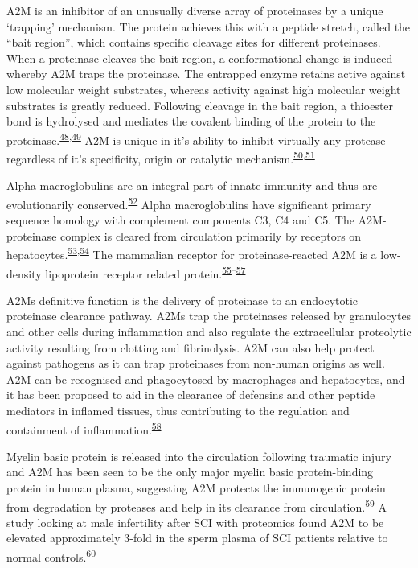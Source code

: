 \documentclass[
]{article}
\begin{document}
A2M is an inhibitor of an unusually diverse array of proteinases by a unique `trapping' mechanism.
The protein achieves this with a peptide stretch, called the ``bait region'', which contains specific cleavage sites for different proteinases.
When a proteinase cleaves the bait region, a conformational change is induced whereby A2M traps the proteinase.
The entrapped enzyme retains active against low molecular weight substrates, whereas activity against high molecular weight substrates is greatly reduced.
Following cleavage in the bait region, a thioester bond is hydrolysed and mediates the covalent binding of the protein to the proteinase.\textsuperscript{\protect\hyperlink{ref-hall_proteolytic_1981}{48},\protect\hyperlink{ref-sottrup-jensen_primary_1984}{49}}
A2M is unique in it's ability to inhibit virtually any protease regardless of it's specificity, origin or catalytic mechanism.\textsuperscript{\protect\hyperlink{ref-khan_oxidized_2004}{50},\protect\hyperlink{ref-lin_n-glycosylation_2012}{51}}

Alpha macroglobulins are an integral part of innate immunity and thus are evolutionarily conserved.\textsuperscript{\protect\hyperlink{ref-buresova_iram2-macroglobulin_2009}{52}}
Alpha macroglobulins have significant primary sequence homology with complement components C3, C4 and C5.
The A2M-proteinase complex is cleared from circulation primarily by receptors on hepatocytes.\textsuperscript{\protect\hyperlink{ref-bond_incorporation_2007}{53},\protect\hyperlink{ref-travis_human_1983}{54}}
The mammalian receptor for proteinase‐reacted A2M is a low‐density lipoprotein receptor related protein.\textsuperscript{\protect\hyperlink{ref-fujiyoshi_amyloid-_2011}{55}--\protect\hyperlink{ref-wyatt_acute_2013}{57}}

A2Ms definitive function is the delivery of proteinase to an endocytotic proteinase clearance pathway.
A2Ms trap the proteinases released by granulocytes and other cells during inflammation and also regulate the extracellular proteolytic activity resulting from clotting and fibrinolysis.
A2M can also help protect against pathogens as it can trap proteinases from non-human origins as well.
A2M can be recognised and phagocytosed by macrophages and hepatocytes, and it has been proposed to aid in the clearance of defensins and other peptide mediators in inflamed tissues, thus contributing to the regulation and containment of inflammation.\textsuperscript{\protect\hyperlink{ref-rehman_alpha-2-macroglobulin_2013}{58}}

Myelin basic protein is released into the circulation following traumatic injury and A2M has been seen to be the only major myelin basic protein-binding protein in human plasma, suggesting A2M protects the immunogenic protein from degradation by proteases and help in its clearance from circulation.\textsuperscript{\protect\hyperlink{ref-gunnarsson_binding_1998}{59}}
A study looking at male infertility after SCI with proteomics found A2M to be elevated approximately 3-fold in the sperm plasma of SCI patients relative to normal controls.\textsuperscript{\protect\hyperlink{ref-silva_towards_2016}{60}}
\end{document}
